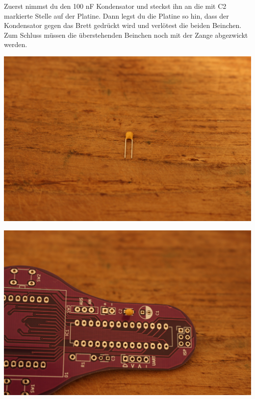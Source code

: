 \documentclass{article}
\begin{document}
Zuerst nimmst du den 100 nF Kondensator und steckst ihn an die mit C2 markierte Stelle auf der Platine.
Dann legst du die Platine so hin, dass der Kondensator gegen das Brett gedrückt wird und verlötest die beiden Beinchen.
Zum Schluss müssen die überstehenden Beinchen noch mit der Zange abgezwickt werden.

\vspace{1cm}

\begin{minipage}[b]{0.5\textwidth}
	\includegraphics[width=\textwidth]{Bilder2024/IMG_0031.JPG}
\end{minipage}
\begin{minipage}[b]{0.5\textwidth}
	\includegraphics[width=\textwidth]{Bilder2024/IMG_0032.JPG}
\end{minipage}
\end{document}
